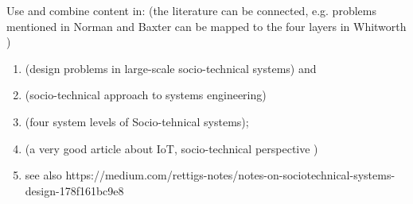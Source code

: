 \begin{svgraybox}
Use and combine content in: (the literature can be connected, e.g. problems mentioned in Norman and Baxter  can be mapped to the four layers in Whitworth )
\begin{enumerate}
\item \cite{Norman2015} (design problems in large-scale socio-technical systems) and 
\item \cite{Baxter2011} (socio-technical approach to systems engineering)
\item \cite{Whitworth2009} (four system levels of Socio-tehnical systems); 
\item \cite{Shin2014} (a very good article about IoT, socio-technical perspective )
\item see also https://medium.com/rettigs-notes/notes-on-sociotechnical-systems-design-178f161bc9e8 
\end{enumerate}
\end{svgraybox}

